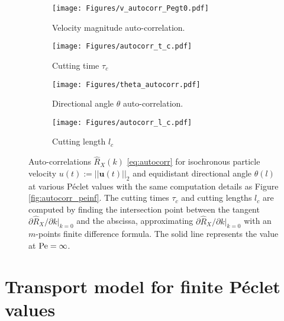 \begin{figure}[h!]
	\centering
	\begin{subfigure}[b]{0.49\textwidth}
		\centering
		\texttt{[image: Figures/v\_autocorr\_Pegt0.pdf]}
		\caption{Velocity magnitude auto-correlation.}
		\label{fig:autocorrv}
	\end{subfigure}
	\hfill
	\begin{subfigure}[b]{0.49\textwidth}
		\centering
		\texttt{[image: Figures/autocorr\_t\_c.pdf]}
		\caption{Cutting time $\tau_c$}
		\label{fig:autocorr_t_c}
	\end{subfigure}
	\begin{subfigure}[b]{0.49\textwidth}
		\centering
		\texttt{[image: Figures/theta\_autocorr.pdf]}
		\caption{Directional angle $\theta$ auto-correlation.}
		\label{fig:autocorrt}
	\end{subfigure}
	\hfill
	\begin{subfigure}[b]{0.49\textwidth}
		\centering
		\texttt{[image: Figures/autocorr\_l\_c.pdf]}
		\caption{Cutting length $l_c$}
		\label{fig:autocorr_l_c}
	\end{subfigure}
	\caption{Auto-correlations $\hat{R}_X(k)$ \eqref{eq:autocorr} for isochronous particle velocity $u(t):=||\textbf{u}(t)||_2$ and equidistant directional angle $\theta(l)$ at various Péclet values with the same computation details as Figure \ref{fig:autocorr_peinf}. The cutting times $\tau_c$ and cutting lengths $l_c$ are computed by finding the intersection point between the tangent $\partial\hat{R}_X/\partial k|_{k=0}$ and the abscissa, approximating $\partial\hat{R}_X/\partial k|_{k=0}$ with an $m$-points finite difference formula. The solid line represents the value at $\mathrm{Pe}=\infty$.}
	\label{fig:autocorr}
\end{figure}

\section{Transport model for finite Péclet values}

